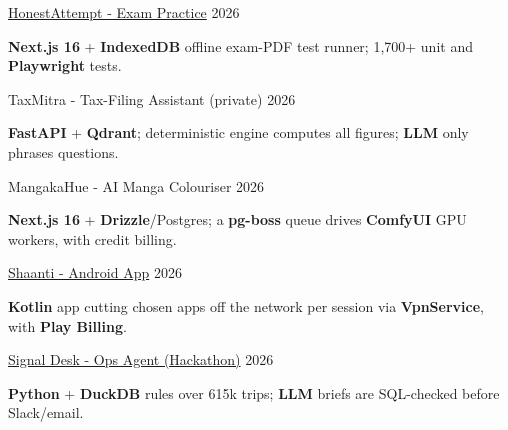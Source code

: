 \begin{cventries}

  \projectentry
  {\href{https://honestattempt.vercel.app}{HonestAttempt - Exam Practice}}
  {2026}
  {}
  {
    \begin{cvitems}
      \item \textbf{Next.js 16} + \textbf{IndexedDB} offline exam-PDF test runner; 1,700+ unit and \textbf{Playwright} tests.
    \end{cvitems}
  }

  \projectentry
  {TaxMitra - Tax-Filing Assistant (private)}
  {2026}
  {}
  {
    \begin{cvitems}
      \item \textbf{FastAPI} + \textbf{Qdrant}; deterministic engine computes all figures; \textbf{LLM} only phrases questions.
    \end{cvitems}
  }

  \projectentry
  {MangakaHue - AI Manga Colouriser}
  {2026}
  {}
  {
    \begin{cvitems}
      \item \textbf{Next.js 16} + \textbf{Drizzle}/Postgres; a \textbf{pg-boss} queue drives \textbf{ComfyUI} GPU workers, with credit billing.
    \end{cvitems}
  }

  \projectentry
  {\href{https://shaanti.pages.dev}{Shaanti - Android App}}
  {2026}
  {}
  {
    \begin{cvitems}
      \item \textbf{Kotlin} app cutting chosen apps off the network per session via \textbf{VpnService}, with \textbf{Play Billing}.
    \end{cvitems}
  }

  \projectentry
  {\href{https://github.com/f20180039/moveinsync-hackathon-research}{Signal Desk - Ops Agent (Hackathon)}}
  {2026}
  {}
  {
    \begin{cvitems}
      \item \textbf{Python} + \textbf{DuckDB} rules over 615k trips; \textbf{LLM} briefs are SQL-checked before Slack/email.
    \end{cvitems}
  }

\end{cventries}
\vspace{-2mm}
